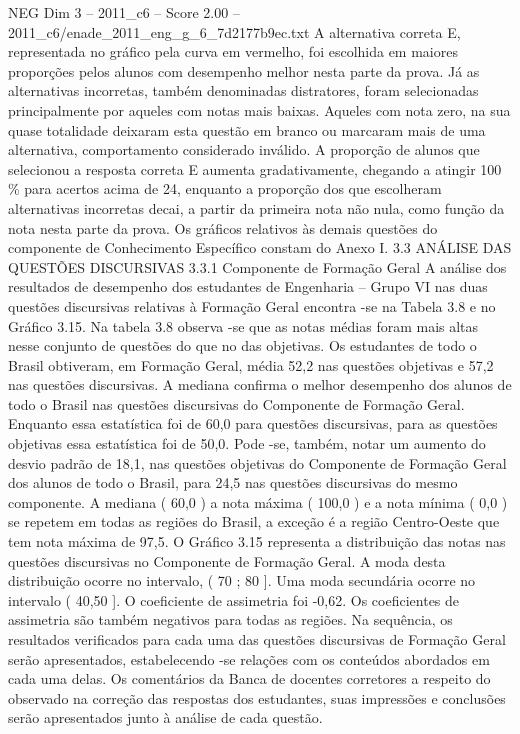 \begin{textsample}{NEG Dim 3 – 2011\_c6 – Score 2.00 – 2011\_c6/enade\_2011\_eng\_g\_6\_7d2177b9ec.txt}
A alternativa correta E, representada no gráfico pela curva em vermelho, foi escolhida em maiores proporções pelos alunos com desempenho melhor nesta parte da prova.
Já as alternativas incorretas, também denominadas distratores, foram selecionadas principalmente por aqueles com notas mais baixas.
Aqueles com nota zero, na sua quase totalidade deixaram esta questão em branco ou marcaram mais de uma alternativa, comportamento considerado inválido.
A proporção de alunos que selecionou a resposta correta E aumenta gradativamente, chegando a atingir 100 \% para acertos acima de 24, enquanto a proporção dos que escolheram alternativas incorretas decai, a partir da primeira nota não nula, como função da nota nesta parte da prova.
Os gráficos relativos às demais questões do componente de Conhecimento Específico constam do Anexo I. 3.3 ANÁLISE DAS QUESTÕES DISCURSIVAS 3.3.1 Componente de Formação Geral A análise dos resultados de desempenho dos estudantes de Engenharia – Grupo VI nas duas questões discursivas relativas à Formação Geral encontra -se na Tabela 3.8 e no Gráfico 3.15.
Na tabela 3.8 observa -se que as notas médias foram mais altas nesse conjunto de questões do que no das objetivas.
Os estudantes de todo o Brasil obtiveram, em Formação Geral, média 52,2 nas questões objetivas e 57,2 nas questões discursivas.
A mediana confirma o melhor desempenho dos alunos de todo o Brasil nas questões discursivas do Componente de Formação Geral.
Enquanto essa estatística foi de 60,0 para questões discursivas, para as questões objetivas essa estatística foi de 50,0.
Pode -se, também, notar um aumento do desvio padrão de 18,1, nas questões objetivas do Componente de Formação Geral dos alunos de todo o Brasil, para 24,5 nas questões discursivas do mesmo componente.
A mediana ( 60,0 ) a nota máxima ( 100,0 ) e a nota mínima ( 0,0 ) se repetem em todas as regiões do Brasil, a exceção é a região Centro-Oeste que tem nota máxima de 97,5.
O Gráfico 3.15 representa a distribuição das notas nas questões discursivas no Componente de Formação Geral.
A moda desta distribuição ocorre no intervalo, ( 70 ; 80 ].
Uma moda secundária ocorre no intervalo ( 40,50 ].
O coeficiente de assimetria foi -0,62.
Os coeficientes de assimetria são também negativos para todas as regiões.
Na sequência, os resultados verificados para cada uma das questões discursivas de Formação Geral serão apresentados, estabelecendo -se relações com os conteúdos abordados em cada uma delas.
Os comentários da Banca de docentes corretores a respeito do observado na correção das respostas dos estudantes, suas impressões e conclusões serão apresentados junto à análise de cada questão.

\end{textsample}
